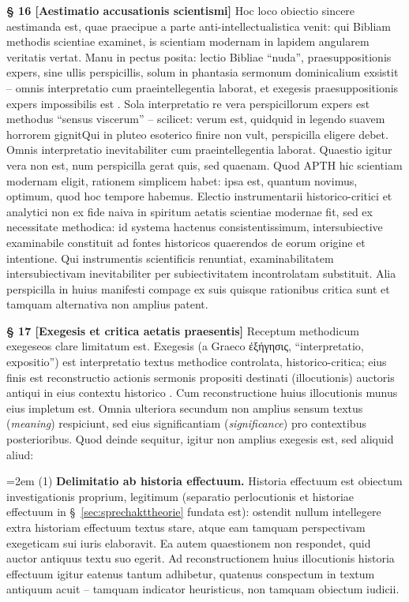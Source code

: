 \documentclass[11pt,a4paper]{article}
\makeatletter
\newcommand{\apth}{{\apthfont APTH}\hspace{0.15em}\xspace}
\newcommand{\subpar}[1]{%
  \begingroup
  \leftskip=2em %
  \noindent#1\par
  \endgroup
}
\newcommand{\apthsec}[3]{%
  \phantomsection%
  \def\@currentlabel{#1}%
  \label{sec:#3}%
  \textbf{§ #1 [#2]}%
}
\makeatother
\begin{document}
\apthsec{16}{Aestimatio accusationis scientismi}{wissenschaftsglaeubigkeit} Hoc loco obiectio sincere aestimanda est, quae praecipue a parte anti-intellectualistica venit: qui Bibliam methodis scientiae examinet, is scientiam modernam in lapidem angularem veritatis vertat. Manu in pectus posita: lectio Bibliae ``nuda'', praesuppositionis expers, sine ullis perspicillis, solum in phantasia sermonum dominicalium exsistit -- omnis interpretatio cum praeintellegentia laborat, et exegesis praesuppositionis expers impossibilis est \citep{bultmann1957,gadamer1960}. Sola interpretatio re vera perspicillorum expers est methodus ``sensus viscerum'' -- scilicet: verum est, quidquid in legendo suavem horrorem gignit\textinterrobang\space Qui in pluteo esoterico finire non vult, perspicilla eligere debet. Omnis interpretatio inevitabiliter cum praeintellegentia laborat. Quaestio igitur vera non est, num perspicilla gerat quis, sed quaenam. Quod \apth hic scientiam modernam eligit, rationem simplicem habet: ipsa est, quantum novimus, optimum, quod hoc tempore habemus. Electio instrumentarii historico-critici et analytici non ex fide naiva in spiritum aetatis scientiae modernae fit, sed ex necessitate methodica: id systema hactenus consistentissimum, intersubiective examinabile constituit ad fontes historicos quaerendos de eorum origine et intentione. Qui instrumentis scientificis renuntiat, examinabilitatem intersubiectivam inevitabiliter per subiectivitatem incontrolatam substituit. Alia perspicilla in huius manifesti compage ex suis quisque rationibus critica sunt et tamquam alternativa non amplius patent.

\apthsec{17}{Exegesis et critica aetatis praesentis}{exegese-zeitkritik} Receptum methodicum exegeseos clare limitatum est. Exegesis (a Graeco ἐξήγησις, ``interpretatio, expositio'') est interpretatio textus methodice controlata, historico-critica; eius finis est reconstructio actionis sermonis propositi destinati (illocutionis) auctoris antiqui in eius contextu historico \citep{stuhlmacher1989}. Cum reconstructione huius illocutionis munus eius impletum est. Omnia ulteriora secundum \citet{hirsch1967} non amplius sensum textus (\textit{meaning}) respiciunt, sed eius significantiam (\textit{significance}) pro contextibus posterioribus. Quod deinde sequitur, igitur non amplius exegesis est, sed aliquid aliud:

\subpar{(1) \textbf{Delimitatio ab historia effectuum.} Historia effectuum est obiectum investigationis proprium, legitimum (separatio perlocutionis et historiae effectuum in §~\ref{sec:sprechakttheorie} fundata est): \citet{gadamer1960} ostendit nullum intellegere extra historiam effectuum textus stare, atque \citet{luz1985} eam tamquam perspectivam exegeticam sui iuris elaboravit. Ea autem quaestionem non respondet, quid auctor antiquus textu suo egerit. Ad reconstructionem huius illocutionis historia effectuum igitur eatenus tantum adhibetur, quatenus conspectum in textum antiquum acuit -- tamquam indicator heuristicus, non tamquam obiectum iudicii.}
\end{document}
